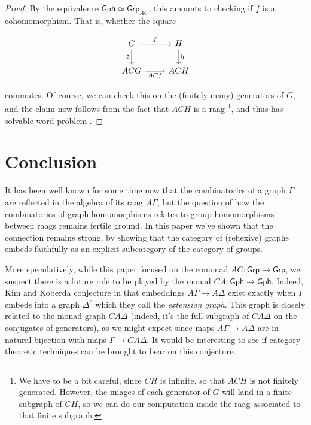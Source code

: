 \documentclass[12pt]{article}
\theoremstyle{definition}
\theoremstyle{theorem}
\newcommand*{\catFont}[1]{\mathsf{#1}}
\newcommand{\Grp}{\catFont{Grp}}
\begin{document}
\begin{proof}
    By the equivalence $\mathsf{Gph} \simeq \Grp_{AC}$, this amounts to 
    checking if $f$ is a cohomomorphism. That is, whether the square

    \[
        \begin{tikzcd}
            G & H \\
            ACG & ACH
            \arrow["f", from=1-1, to=1-2]
            \arrow["\mathfrak{g}"', from=1-1, to=2-1]
            \arrow["ACf"', from=2-1, to=2-2]
            \arrow["\mathfrak{h}", from=1-2, to=2-2]
        \end{tikzcd}
    \]

    commutes. Of course, we can check this on the (finitely many) generators
    of $G$, 
    and the claim now follows from the fact that $ACH$ is a raag%
    \footnote{We have to be a bit careful, since $CH$ is infinite, so that 
    $ACH$ is not finitely generated. However, the images of each generator 
    of $G$ will land in a finite subgraph of $CH$, so we can do our 
    computation inside the raag associated to that finite subgraph.}, and thus
    has solvable word problem \cite{charneyIntroductionRightangledArtin2007}.
\end{proof}


\section{Conclusion}
\label{conclusion}

It has been well known for some time now that the combinatorics of a graph
$\Gamma$ are reflected in the algebra of its raag $A\Gamma$, but the 
question of how the combinatorics of graph homomorphisms relates to 
group homomorphisms between raags remains fertile ground. In this paper we've 
shown that the connection remains strong, by showing that the category of
(reflexive) graphs embeds faithfully as an explicit subcategory of 
the category of groups. 

More speculatively, while this paper focused on the comonad $AC : \Grp \to \Grp$,
we suspect there is a future role to be played by the monad 
$CA : \mathsf{Gph} \to \mathsf{Gph}$. Indeed, Kim and Koberda conjecture 
in \cite{kimEmbedabilityRightangledArtin2013} that embeddings 
$A\Gamma \to A \Delta$ exist exactly when $\Gamma$ embeds into a 
graph $\Delta^e$ which they call the \emph{extension graph}.
This graph is closely related to the monad graph $CA\Delta$
(indeed, it's the full subgraph of $CA\Delta$ on the conjugates of generators),
as we might expect since
maps $A\Gamma \to A \Delta$ are in natural bijection with maps 
$\Gamma \to CA \Delta$. It would be interesting to see if category theoretic
techniques can be brought to bear on this conjecture.



\newpage
\nocite{*}


\end{document}

